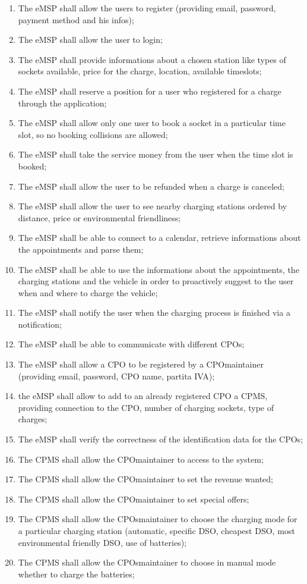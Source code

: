 \begin{enumerate}[label=\textbf{R\arabic*}]
    \item The \ac{eMSP} shall allow the users to register (providing email, password, payment method and his infos);
    \item The \ac{eMSP} shall allow the user to login;
    \item The \ac{eMSP} shall provide informations about a chosen station like types of sockets available, price for the charge, location, available timeslots;
    \item The \ac{eMSP} shall reserve a position for a user who registered for a charge through the application;
    \item The \ac{eMSP} shall allow only one user to book a socket in a particular time slot, so no booking collisions are allowed;
    \item The \ac{eMSP} shall take the service money from the user when the time slot is booked;
    \item The \ac{eMSP} shall allow the user to be refunded when a charge is canceled;
    \item The \ac{eMSP} shall allow the user to see nearby charging stations ordered by distance, price or environmental friendliness;
    \item The \ac{eMSP} shall be able to connect to a calendar, retrieve informations about the appointments and parse them;
    \item The \ac{eMSP} shall be able to use the informations about the appointments, the charging stations and the vehicle in order to proactively suggest to the user when and where to charge the vehicle;
    \item The \ac{eMSP} shall notify the user when the charging process is finished via a notification;
    \item The \ac{eMSP} shall be able to communicate with different \acp{CPO};
    \item The \ac{eMSP} shall allow a \ac{CPO} to be registered by a \ac{CPO}maintainer (providing email, password, \ac{CPO} name, \gls{partita IVA});
    \item the \ac{eMSP} shall allow to add to an already registered \ac{CPO} a \ac{CPMS}, providing connection to the \ac{CPO}, number of charging sockets, type of charges;
    \item The \ac{eMSP} shall verify the correctness of the identification data for the \acp{CPO};
    \item The \ac{CPMS} shall allow the \ac{CPO}maintainer to access to the system;
    \item The \ac{CPMS} shall allow the \ac{CPO}maintainer to set the revenue wanted;
    \item The \ac{CPMS} shall allow the \ac{CPO}maintainer to set special offers;
    \item The \ac{CPMS} shall allow the \acp{CPO}maintainer to choose the charging mode for a particular charging station (automatic, specific \ac{DSO}, cheapest \ac{DSO}, most environmental friendly \ac{DSO}, use of batteries);
    \item The \ac{CPMS} shall allow the \acp{CPO}maintainer to choose in manual mode whether to charge the batteries;


\end{enumerate}
